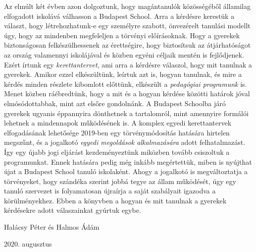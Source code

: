 Az elmúlt két évben azon dolgoztunk, hogy magántanulók közösségéből államilag elfogadott iskolává válhasson a Budapest School. Arra a kérdésre kerestük a választ, hogy létrehozhatunk-e egy személyre szabott, önvezérelt tanulási modellt úgy, hogy az mindenben megfeleljen a törvényi előírásoknak. Hogy a gyerekek biztonságosan felkészülhessenek az érettségire, hogy biztosítsuk az átjárhatóságot az ország valamennyi iskolájával és közben egyéni céljaik mentén is fejlődjenek. Ezért írtunk egy \emph{kerettantervet}, ami arra a kérdésre válaszol, hogy mit tanulnak a gyerekek. Amikor ezzel elkészültünk, leírtuk azt is, hogyan tanulnak, és mire a kérdés minden részlete kibomlott előttünk, elkészült a \emph{pedagógiai programunk} is. Menet közben ráébredtünk, hogy a mit és a hogyan kérdése közötti határok jóval elmósódottabbak, mint azt elsőre gondolnánk. A Budapest Schoolba járó gyerekek ugyanis éppannyira dönthetnek a tartalomról, mint amennyire formálói lehetnek a mindennapok működésének is. A komplex egyedi kerettantervek elfogadásának lehetősége 2019-ben egy törvénymódosítás hatására hirtelen megszűnt, és a jogalkotó  \emph{egyedi megoldások alkalmazására} adott felhatalmazást. Így egy újabb jogi eljárást kezdeményeztünk miközben tovább csiszoltuk a programunkat. Ennek hatására pedig még inkább megértettük, miben is nyújthat újat a Budapest School tanuló iskolaként. Ahogy a jogalkotó is megváltoztatja a törvényeket, hogy szándéka szerint jobbá tegye az állam működését, úgy egy tanuló szervezet is folyamatosan újraírja a saját szabályait igazodva a körülményekhez. Ebben a könyvben a hogyan és mit tanulnak a gyerekek kérdésekre adott válaszainkat gyúrtuk egybe.       


\bigskip
{
\raggedright Halácsy Péter és Halmos Ádám\\
\raggedright 2020. augusztus
}